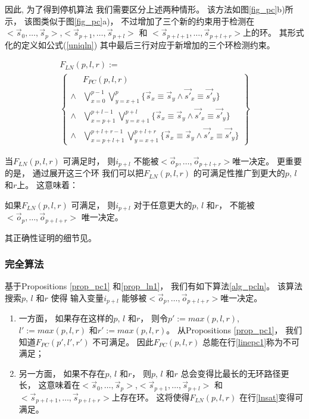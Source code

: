 因此,
为了得到停机算法
我们需要区分上述两种情形。
该方法如图\ref{fig_pc}b)所示，
该图类似于图\ref{fig_pc}a)，
不过增加了三个新的约束用于检测在$<\vec{s}_{0},\dots,\vec{s}_{p}>$,$<\vec{s}_{p+1},\dots,\vec{s}_{p+l}>$ 和
$<\vec{s}_{p+l+1},\dots,\vec{s}_{p+l+r}>$上的环。
其形式化的定义如公式(\ref{uniqln}) 
其中最后三行对应于新增加的三个环检测约束。

\begin{multline}\label{uniqln}
F_{LN}(p,l,r):=\\
\left\{
\begin{array}{cc}
&F_{PC}(p,l,r)\\
\wedge&\bigvee_{x=0}^{p-1}\bigvee_{y=x+1}^{p} \{\vec{s}_x\equiv \vec{s}_y\wedge \vec{s'}_x\equiv \vec{s'}_y\} \\
\wedge&\bigvee_{x=p+1}^{p+l-1}\bigvee_{y=x+1}^{p+l} \{\vec{s}_x\equiv \vec{s}_y\wedge \vec{s'}_x\equiv \vec{s'}_y\} \\
\wedge&\bigvee_{x=p+l+1}^{p+l+r-1}\bigvee_{y=x+1}^{p+l+r} \{\vec{s}_x\equiv \vec{s}_y\wedge \vec{s'}_x\equiv \vec{s'}_y\}
\end{array}
\right\}
\end{multline}



当$F_{LN}(p,l,r)$ 可满足时，
则$i_{p+l}$ 不能被$<\vec{o}_{p},\dots,\vec{o}_{p+l+r}>$唯一决定。
更重要的是，
通过展开这三个环
我们可以把$F_{LN}(p,l,r)$ 的可满足性推广到更大的$p$, $l$ 和$r$上。
这意味着：


\begin{proposition}\label{prop_ln1}
如果$F_{LN}(p,l,r)$ 可满足，
则$i_{p+l}$ 对于任意更大的$p$, $l$ 和$r$，
不能被$<\vec{o}_{p},\dots,\vec{o}_{p+l+r}>$ 唯一决定。
\end{proposition}

其正确性证明的细节见\cite{ShenTCAD11}。

\subsubsection{完全算法}\label{subsub_algo}

基于Propositions \ref{prop_pc1} 和\ref{prop_ln1}，
我们有如下算法\ref{alg_pcln}。
该算法搜索$p$, $l$ 和$r$ 使得
输入变量$i_{p+l}$ 能够被$<\vec{o}_{p},\dots,\vec{o}_{p+l+r}>$唯一决定。
\begin{enumerate}
 \item
一方面，
如果存在这样的$p$, $l$ 和$r$，
则令$p':=max(p,l,r)$, $l':=max(p,l,r)$ 和$r':=max(p,l,r)$。
从Propositions \ref{prop_pc1}，
我们知道$F_{PC}(p',l',r')$ 不可满足。
因此$F_{PC}(p,l,r)$ 总能在行\ref{linepc1}称为不可满足；
 \item
另一方面，
如果不存在$p$, $l$ 和$r$，
则$p$, $l$ 和$r$ 总会变得比最长的无环路径更长，
这意味着在$<\vec{s}_{0},\dots,\vec{s}_{p}>$,$<\vec{s}_{p+1},\dots,\vec{s}_{p+l}>$ 和
$<\vec{s}_{p+l+1},\dots,\vec{s}_{p+l+r}>$上存在环。
这将使得$F_{LN}(p,l,r)$ 在行\ref{lnsat}变得可满足。
\end{enumerate}


